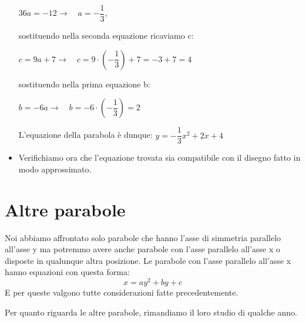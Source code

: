 \begin{esempio}
\begin{itemize}
\(36a=-12 \rightarrow \quad a=-\dfrac{1}{3}\),

sostituendo nella seconda equazione ricaviamo c:

\(c= 9a+7 \rightarrow \quad c=9 \cdot \left(- \dfrac{1}{3} \right) +7=-3+7=4\)

sostituendo nella prima equazione b:

\(b=-6a \rightarrow \quad b=-6 \cdot \left(- \dfrac{1}{3} \right)=2\)

L'equazione della parabola è dunque: \(y=-\dfrac{1}{3}x^2+2x+4\)

  \item Verifichiamo ora che l'equazione trovata sia compatibile con il disegno
  fatto in modo approssimato.
 \end{itemize}
\end{esempio}


\section{Altre parabole}
\label{sec:parabola_altreparabole}

Noi abbiamo affrontato solo parabole che hanno l'asse di simmetria parallelo
all'asse y ma potremmo avere anche parabole con l'asse parallelo all'asse x
o disposte in qualunque altra posizione.
Le parabole con l'asse parallelo all'asse x hanno equazioni con questa forma:
\[x=ay^2+by+c\]
E per queste valgono tutte considerazioni fatte precedentemente.

Per quanto riguarda le altre parabole, rimandiamo il loro studio di qualche
anno.
